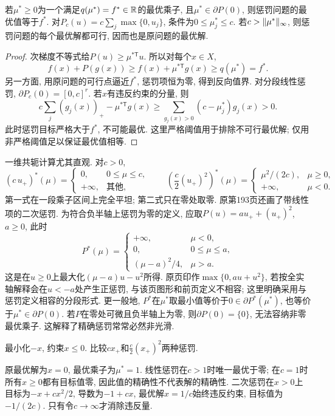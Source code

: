 \begin{proposition}\label{prop:exact-penalty}
若$\mu^*\ge0$为一个满足$q(\mu^*)=f^*\in\mathbb R$的最优乘子, 且$\mu^*\in\partial P(0)$, 则惩罚问题的最优值等于$f^*$. 对$P_c(u)=c\sum_j\max\{0,u_j\}$, 条件为$0\le\mu_j^*\le c$. 若$c>\lVert \mu^*\rVert_\infty$, 则惩罚问题的每个最优解都可行, 因而也是原问题的最优解.
\end{proposition}
\begin{proof}
次梯度不等式给$P(u)\ge\mu^{*\mathsf T}u$. 所以对每个$x\in X$,
\[
 f(x)+P(g(x))\ge f(x)+\mu^{*\mathsf T}g(x)\ge q(\mu^*)=f^*.
\]
另一方面, 用原问题的可行点逼近$f^*$, 惩罚项恒为零, 得到反向值界. 对分段线性惩罚, $\partial P_c(0)=[0,c]^r$. 若$x$有违反约束的分量, 则
\[
 c\sum_j(g_j(x))_+-\mu^{*\mathsf T}g(x)
 \ge\sum_{g_j(x)>0}(c-\mu_j^*)g_j(x)>0.
\]
此时惩罚目标严格大于$f^*$, 不可能最优. 这里严格阈值用于排除不可行最优解; 仅用非严格阈值足以保证最优值相等.
\end{proof}

一维共轭计算尤其直观. 对$c>0$,
\[
 (c\,u_+)^*(\mu)=
 \begin{cases}0,&0\le\mu\le c,\\+\infty,&\text{其他},\end{cases}
 \qquad
 \left(\frac c2(u_+)^2\right)^*(\mu)=
 \begin{cases}\mu^2/(2c),&\mu\ge0,\\+\infty,&\mu<0.\end{cases}
\]
第一式在一段乘子区间上完全平坦; 第二式只在零处取零. 原第193页还画了带线性项的二次惩罚. 为符合负半轴上惩罚为零的定义, 应取$P(u)=a u_++(u_+)^2$, $a\ge0$, 此时
\[
 P^*(\mu)=\begin{cases}
 +\infty,&\mu<0,\\0,&0\le\mu\le a,\\(\mu-a)^2/4,&\mu>a.
 \end{cases}
\]
这是在$u\ge0$上最大化$(\mu-a)u-u^2$所得. 原页印作$\max\{0,au+u^2\}$, 若按全实轴解释会在$u<-a$处产生正惩罚, 与该页图形和前页定义不相容; 这里明确采用与惩罚定义相容的分段形式. 更一般地, $P^*$在$\mu^*$取最小值等价于$0\in\partial P^*(\mu^*)$, 也等价于$\mu^*\in\partial P(0)$. 若$P$在零处可微且负半轴上为零, 则$\partial P(0)=\{0\}$, 无法容纳非零最优乘子. 这解释了精确惩罚常常必然非光滑.

\begin{example}
最小化$-x$, 约束$x\le0$. 比较$c x_+$和$\frac c2(x_+)^2$两种惩罚.
\end{example}
\begin{solution}
原最优解为$x=0$, 最优乘子为$\mu^*=1$. 线性惩罚在$c>1$时唯一最优于零; 在$c=1$时所有$x\ge0$都有目标值零, 因此值的精确性不代表解的精确性. 二次惩罚在$x>0$上目标为$-x+cx^2/2$, 导数为$-1+cx$, 最优解$x=1/c$始终违反约束, 目标值为$-1/(2c)$. 只有令$c\to\infty$才消除违反量.
\end{solution}

